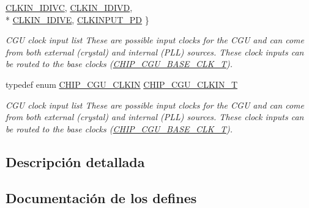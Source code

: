 \begin{DoxyCompactItemize}
\hyperlink{group___c_l_o_c_k__18_x_x__43_x_x_gga419aa2b9970dcf4930eb44871da9e377ac08cb97457d4de7c50a9d775d26d7dcc}{C\+L\+K\+I\+N\+\_\+\+I\+D\+I\+VC}, 
\hyperlink{group___c_l_o_c_k__18_x_x__43_x_x_gga419aa2b9970dcf4930eb44871da9e377a4e433bee2205fdac865a7a9adb94d25a}{C\+L\+K\+I\+N\+\_\+\+I\+D\+I\+VD}, 
\\*
\hyperlink{group___c_l_o_c_k__18_x_x__43_x_x_gga419aa2b9970dcf4930eb44871da9e377a2f855e496263ba3d88be98f69cfc5640}{C\+L\+K\+I\+N\+\_\+\+I\+D\+I\+VE}, 
\hyperlink{group___c_l_o_c_k__18_x_x__43_x_x_gga419aa2b9970dcf4930eb44871da9e377a01c7e5b28a27ce99a5c68c0f4c701493}{C\+L\+K\+I\+N\+P\+U\+T\+\_\+\+PD}
 \}\begin{DoxyCompactList}\small\item\em C\+GU clock input list These are possible input clocks for the C\+GU and can come from both external (crystal) and internal (P\+LL) sources. These clock inputs can be routed to the base clocks (\hyperlink{chip__clocks_8h_a31e266dd83cc66eb866d8d051ffd1d45}{C\+H\+I\+P\+\_\+\+C\+G\+U\+\_\+\+B\+A\+S\+E\+\_\+\+C\+L\+K\+\_\+T}). \end{DoxyCompactList}
\item 
typedef enum \hyperlink{group___c_l_o_c_k__18_x_x__43_x_x_ga419aa2b9970dcf4930eb44871da9e377}{C\+H\+I\+P\+\_\+\+C\+G\+U\+\_\+\+C\+L\+K\+IN} \hyperlink{group___c_l_o_c_k__18_x_x__43_x_x_ga0975326707efebf2b074283e6c602f18}{C\+H\+I\+P\+\_\+\+C\+G\+U\+\_\+\+C\+L\+K\+I\+N\+\_\+T}
\begin{DoxyCompactList}\small\item\em C\+GU clock input list These are possible input clocks for the C\+GU and can come from both external (crystal) and internal (P\+LL) sources. These clock inputs can be routed to the base clocks (\hyperlink{chip__clocks_8h_a31e266dd83cc66eb866d8d051ffd1d45}{C\+H\+I\+P\+\_\+\+C\+G\+U\+\_\+\+B\+A\+S\+E\+\_\+\+C\+L\+K\+\_\+T}). \end{DoxyCompactList}\end{DoxyCompactItemize}


\subsection{Descripción detallada}


\subsection{Documentación de los \textquotesingle{}defines\textquotesingle{}}
